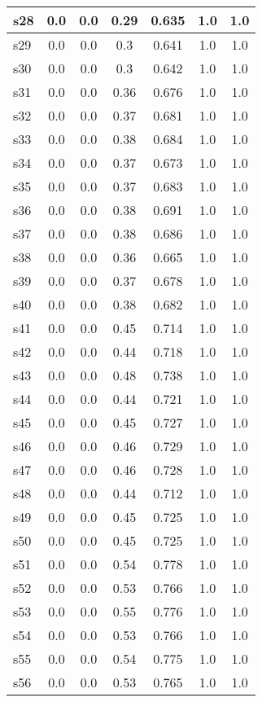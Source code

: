 \documentclass{article}
\begin{document}
\begin{tabular}{|l|c|c|c|c|c|c|}
\hline
s28 &0.0 & 0.0 & 0.29 & 0.635 & 1.0 & 1.0\\
\hline
s29 &0.0 & 0.0 & 0.3 & 0.641 & 1.0 & 1.0\\
\hline
s30 &0.0 & 0.0 & 0.3 & 0.642 & 1.0 & 1.0\\
\hline
s31 &0.0 & 0.0 & 0.36 & 0.676 & 1.0 & 1.0\\
\hline
s32 &0.0 & 0.0 & 0.37 & 0.681 & 1.0 & 1.0\\
\hline
s33 &0.0 & 0.0 & 0.38 & 0.684 & 1.0 & 1.0\\
\hline
s34 &0.0 & 0.0 & 0.37 & 0.673 & 1.0 & 1.0\\
\hline
s35 &0.0 & 0.0 & 0.37 & 0.683 & 1.0 & 1.0\\
\hline
s36 &0.0 & 0.0 & 0.38 & 0.691 & 1.0 & 1.0\\
\hline
s37 &0.0 & 0.0 & 0.38 & 0.686 & 1.0 & 1.0\\
\hline
s38 &0.0 & 0.0 & 0.36 & 0.665 & 1.0 & 1.0\\
\hline
s39 &0.0 & 0.0 & 0.37 & 0.678 & 1.0 & 1.0\\
\hline
s40 &0.0 & 0.0 & 0.38 & 0.682 & 1.0 & 1.0\\
\hline
s41 &0.0 & 0.0 & 0.45 & 0.714 & 1.0 & 1.0\\
\hline
s42 &0.0 & 0.0 & 0.44 & 0.718 & 1.0 & 1.0\\
\hline
s43 &0.0 & 0.0 & 0.48 & 0.738 & 1.0 & 1.0\\
\hline
s44 &0.0 & 0.0 & 0.44 & 0.721 & 1.0 & 1.0\\
\hline
s45 &0.0 & 0.0 & 0.45 & 0.727 & 1.0 & 1.0\\
\hline
s46 &0.0 & 0.0 & 0.46 & 0.729 & 1.0 & 1.0\\
\hline
s47 &0.0 & 0.0 & 0.46 & 0.728 & 1.0 & 1.0\\
\hline
s48 &0.0 & 0.0 & 0.44 & 0.712 & 1.0 & 1.0\\
\hline
s49 &0.0 & 0.0 & 0.45 & 0.725 & 1.0 & 1.0\\
\hline
s50 &0.0 & 0.0 & 0.45 & 0.725 & 1.0 & 1.0\\
\hline
s51 &0.0 & 0.0 & 0.54 & 0.778 & 1.0 & 1.0\\
\hline
s52 &0.0 & 0.0 & 0.53 & 0.766 & 1.0 & 1.0\\
\hline
s53 &0.0 & 0.0 & 0.55 & 0.776 & 1.0 & 1.0\\
\hline
s54 &0.0 & 0.0 & 0.53 & 0.766 & 1.0 & 1.0\\
\hline
s55 &0.0 & 0.0 & 0.54 & 0.775 & 1.0 & 1.0\\
\hline
s56 &0.0 & 0.0 & 0.53 & 0.765 & 1.0 & 1.0\\

\end{tabular}
\end{document}
